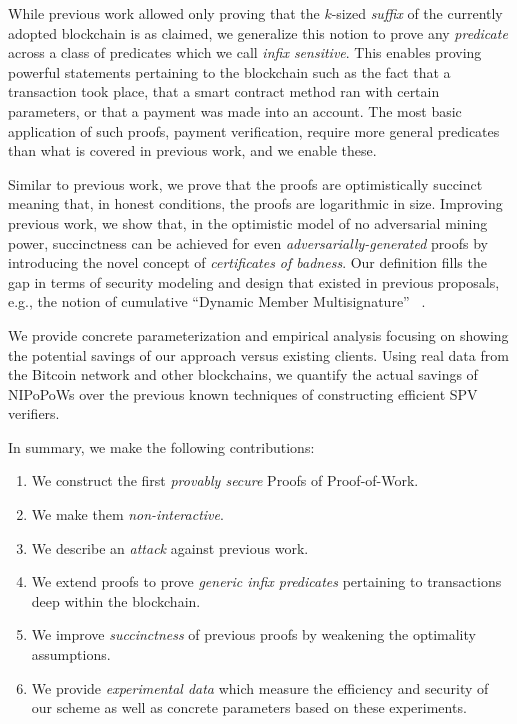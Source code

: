 While previous work allowed only proving that the $k$-sized \emph{suffix} of the
currently adopted blockchain is as claimed, we generalize this notion to prove
any \emph{predicate} across a class of predicates which we call \emph{infix
sensitive}. This enables proving powerful statements pertaining to the
blockchain such as the fact that a transaction took place, that a smart contract
method ran with certain parameters, or that a payment was made into an account.
The most basic application of such proofs, payment verification, require more
general predicates than what is covered in previous work, and we enable these.

Similar to previous work, we prove that the proofs are optimistically
succinct meaning that, in honest conditions, the proofs are logarithmic in size.
Improving previous work, we show that, in the optimistic model of no adversarial
mining power, succinctness can be achieved for even
\textit{adversarially-generated} proofs by introducing the novel concept of
\textit{certificates of badness}. Our definition fills the gap in terms of
security modeling and design that existed in previous proposals, e.g., the
notion of cumulative ``Dynamic Member Multisignature'' ~\cite{sidechains}.

We provide concrete parameterization and empirical analysis focusing on showing
the potential savings of our approach versus existing clients. Using real data
from the Bitcoin network and other blockchains, we quantify the actual savings of
NIPoPoWs over the previous known techniques of constructing efficient SPV
verifiers.

In summary, we make the following contributions:
\begin{enumerate}
  \item We construct the first \emph{provably secure} Proofs of Proof-of-Work.
  \item We make them \emph{non-interactive}.
  \item We describe an \emph{attack} against previous work.
  \item We extend proofs to prove \emph{generic infix predicates} pertaining to
        transactions deep within the blockchain.
  \item We improve \emph{succinctness} of previous proofs by weakening the
        optimality assumptions.
  \item We provide \emph{experimental data} which measure the efficiency and
        security of our scheme as well as concrete parameters based on these
        experiments.
\end{enumerate}
